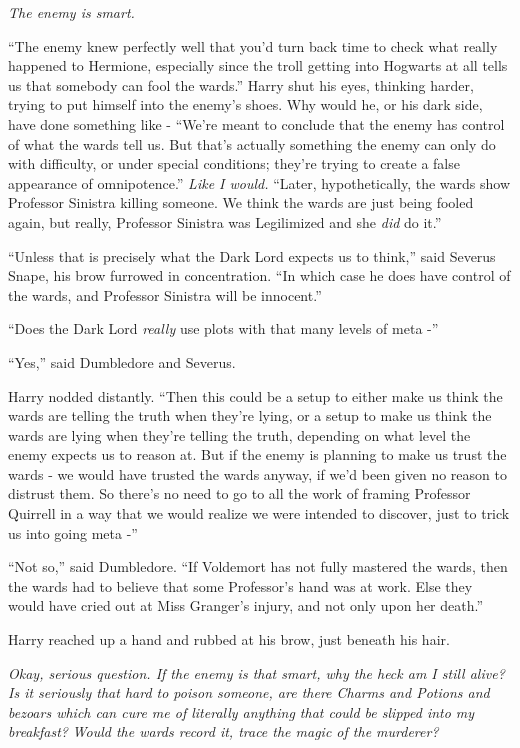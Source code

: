 \emph{The enemy is smart.}

``The enemy knew perfectly well that you'd turn back time to check what
really happened to Hermione, especially since the troll getting into
Hogwarts at all tells us that somebody can fool the wards.'' Harry shut
his eyes, thinking harder, trying to put himself into the enemy's shoes.
Why would he, or his dark side, have done something like - ``We're meant
to conclude that the enemy has control of what the wards tell us. But
that's actually something the enemy can only do with difficulty, or
under special conditions; they're trying to create a false appearance of
omnipotence.'' \emph{Like I would.} ``Later, hypothetically, the wards
show Professor Sinistra killing someone. We think the wards are just
being fooled again, but really, Professor Sinistra was Legilimized and
she \emph{did} do it.''

``Unless that is precisely what the Dark Lord expects us to think,''
said Severus Snape, his brow furrowed in concentration. ``In which case
he does have control of the wards, and Professor Sinistra will be
innocent.''

``Does the Dark Lord \emph{really} use plots with that many levels of
meta -''

``Yes,'' said Dumbledore and Severus.

Harry nodded distantly. ``Then this could be a setup to either make us
think the wards are telling the truth when they're lying, or a setup to
make us think the wards are lying when they're telling the truth,
depending on what level the enemy expects us to reason at. But if the
enemy is planning to make us trust the wards - we would have trusted the
wards anyway, if we'd been given no reason to distrust them. So there's
no need to go to all the work of framing Professor Quirrell in a way
that we would realize we were intended to discover, just to trick us
into going meta -''

``Not so,'' said Dumbledore. ``If Voldemort has not fully mastered the
wards, then the wards had to believe that some Professor's hand was at
work. Else they would have cried out at Miss Granger's injury, and not
only upon her death.''

Harry reached up a hand and rubbed at his brow, just beneath his hair.

\emph{Okay, serious question. If the enemy is that smart, why the heck
am I still alive? Is it seriously that hard to poison someone, are there
Charms and Potions and bezoars which can cure me of literally anything
that could be slipped into my breakfast?} \emph{Would the wards record
it, trace the magic of the murderer?}

